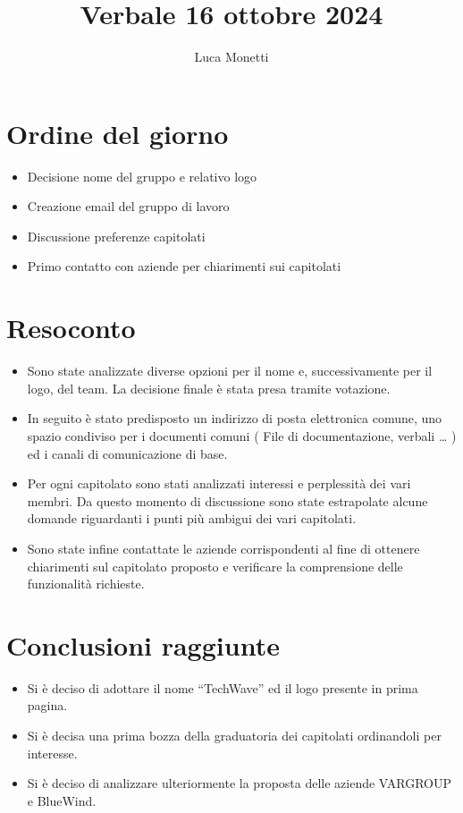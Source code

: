 \documentclass{TWReport}
\title{Verbale 16 ottobre 2024}
\author{Luca Monetti}
\begin{document}
\frontmatter

\showPartecipants

\section*{Ordine del giorno}
\begin{itemize}
    \item Decisione nome del gruppo e relativo logo
    \item Creazione email del gruppo di lavoro
    \item Discussione preferenze capitolati
    \item Primo contatto con aziende per chiarimenti sui capitolati
\end{itemize}

\section*{Resoconto}
\begin{itemize}
    \item Sono state analizzate diverse opzioni per il nome e, successivamente per il logo, del team. La decisione finale è stata presa tramite votazione.
    \item In seguito è stato predisposto un indirizzo di posta elettronica comune, uno spazio condiviso per i documenti comuni ( File di documentazione, verbali … ) ed i canali di comunicazione di base.
    \item Per ogni capitolato sono stati analizzati interessi e perplessità dei vari membri. Da questo momento di discussione sono state estrapolate alcune domande riguardanti i punti più ambigui dei vari capitolati.
    \item Sono state infine contattate le aziende corrispondenti al fine di ottenere chiarimenti sul capitolato proposto e verificare la comprensione delle funzionalità richieste.

\end{itemize}

\section*{Conclusioni raggiunte}
\begin{itemize}
    \item Si è deciso di adottare il nome “TechWave” ed il logo presente in prima pagina.
    \item Si è decisa una prima bozza della graduatoria dei capitolati ordinandoli per interesse.
    \item Si è deciso di analizzare ulteriormente la proposta delle aziende VARGROUP e BlueWind.
\end{itemize}
\end{document}
